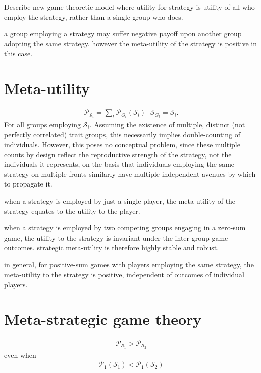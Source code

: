 \documentclass[twocolumn, aps, rmp, amsmath, amssymb, nofootinbib, superscriptaddress, longbibliography, floatfix, table-of-contents, eqsecnum]{revtex4-2}
\begin{document}
Describe new game-theoretic model where utility for strategy is utility of all who employ the strategy, rather than a single group who does.

a group employing a strategy may suffer negative payoff upon another group adopting the same strategy. however the meta-utility of the strategy is positive in this case.

\section{Meta-utility}

\begin{align}
\mathcal{P}_{\mathcal{S}_i} = \sum_{t} \mathcal{P}_{G_t}(\mathcal{S}_i)\, |\, \mathcal{S}_{G_t} = \mathcal{S}_i.
\end{align}
For all groups employing $\mathcal{S}_i$. Assuming the existence of multiple, distinct (not perfectly correlated) trait groups, this necessarily implies double-counting of individuals. However, this poses no conceptual problem, since these multiple counts by design reflect the reproductive strength of the strategy, not the individuals it represents, on the basis that individuals employing the same strategy on multiple fronts similarly have multiple independent avenues by which to propagate it.

when a strategy is employed by just a single player, the meta-utility of the strategy equates to the utility to the player.

when a strategy is employed by two competing groups engaging in a zero-sum game, the utility to the strategy is invariant under the inter-group game outcomes. strategic meta-utility is therefore highly stable and robust.

in general, for positive-sum games with players employing the same strategy, the meta-utility to the strategy is positive, independent of outcomes of individual players.

\section{Meta-strategic game theory}

\begin{align}
\mathcal{P}_{\mathcal{S}_1} > \mathcal{P}_{\mathcal{S}_2}	
\end{align}
even when
\begin{align}
\mathcal{P}_1(\mathcal{S}_1) < \mathcal{P}_1(\mathcal{S}_2)
\end{align}
\end{document}
